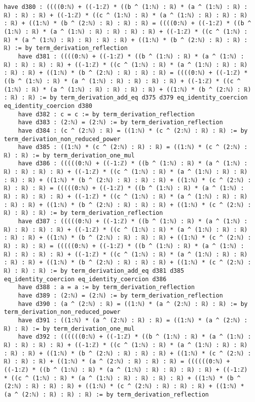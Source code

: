 \documentclass{article}
\begin{document}
\begin{tcolorbox}[colback=white!10, width=\linewidth]
\begin{lstlisting}[language=Lean4]
    have d380 : ((((0:ℕ) + ((-1:ℤ) * ((b ^ (1:ℕ) : ℝ) * (a ^ (1:ℕ) : ℝ) : ℝ) : ℝ) : ℝ) + ((-1:ℤ) * ((c ^ (1:ℕ) : ℝ) * (a ^ (1:ℕ) : ℝ) : ℝ) : ℝ) : ℝ) + ((1:ℕ) * (b ^ (2:ℕ) : ℝ) : ℝ) : ℝ) = ((((0:ℕ) + ((-1:ℤ) * ((b ^ (1:ℕ) : ℝ) * (a ^ (1:ℕ) : ℝ) : ℝ) : ℝ) : ℝ) + ((-1:ℤ) * ((c ^ (1:ℕ) : ℝ) * (a ^ (1:ℕ) : ℝ) : ℝ) : ℝ) : ℝ) + ((1:ℕ) * (b ^ (2:ℕ) : ℝ) : ℝ) : ℝ) := by term_derivation_reflection
    have d381 : ((((0:ℕ) + ((-1:ℤ) * ((b ^ (1:ℕ) : ℝ) * (a ^ (1:ℕ) : ℝ) : ℝ) : ℝ) : ℝ) + ((-1:ℤ) * ((c ^ (1:ℕ) : ℝ) * (a ^ (1:ℕ) : ℝ) : ℝ) : ℝ) : ℝ) + ((1:ℕ) * (b ^ (2:ℕ) : ℝ) : ℝ) : ℝ) = ((((0:ℕ) + ((-1:ℤ) * ((b ^ (1:ℕ) : ℝ) * (a ^ (1:ℕ) : ℝ) : ℝ) : ℝ) : ℝ) + ((-1:ℤ) * ((c ^ (1:ℕ) : ℝ) * (a ^ (1:ℕ) : ℝ) : ℝ) : ℝ) : ℝ) + ((1:ℕ) * (b ^ (2:ℕ) : ℝ) : ℝ) : ℝ) := by term_derivation_add_eq d375 d379 eq_identity_coercion eq_identity_coercion d380
    have d382 : c = c := by term_derivation_reflection
    have d383 : (2:ℕ) = (2:ℕ) := by term_derivation_reflection
    have d384 : (c ^ (2:ℕ) : ℝ) = ((1:ℕ) * (c ^ (2:ℕ) : ℝ) : ℝ) := by term_derivation_non_reduced_power
    have d385 : ((1:ℕ) * (c ^ (2:ℕ) : ℝ) : ℝ) = ((1:ℕ) * (c ^ (2:ℕ) : ℝ) : ℝ) := by term_derivation_one_mul
    have d386 : (((((0:ℕ) + ((-1:ℤ) * ((b ^ (1:ℕ) : ℝ) * (a ^ (1:ℕ) : ℝ) : ℝ) : ℝ) : ℝ) + ((-1:ℤ) * ((c ^ (1:ℕ) : ℝ) * (a ^ (1:ℕ) : ℝ) : ℝ) : ℝ) : ℝ) + ((1:ℕ) * (b ^ (2:ℕ) : ℝ) : ℝ) : ℝ) + ((1:ℕ) * (c ^ (2:ℕ) : ℝ) : ℝ) : ℝ) = (((((0:ℕ) + ((-1:ℤ) * ((b ^ (1:ℕ) : ℝ) * (a ^ (1:ℕ) : ℝ) : ℝ) : ℝ) : ℝ) + ((-1:ℤ) * ((c ^ (1:ℕ) : ℝ) * (a ^ (1:ℕ) : ℝ) : ℝ) : ℝ) : ℝ) + ((1:ℕ) * (b ^ (2:ℕ) : ℝ) : ℝ) : ℝ) + ((1:ℕ) * (c ^ (2:ℕ) : ℝ) : ℝ) : ℝ) := by term_derivation_reflection
    have d387 : (((((0:ℕ) + ((-1:ℤ) * ((b ^ (1:ℕ) : ℝ) * (a ^ (1:ℕ) : ℝ) : ℝ) : ℝ) : ℝ) + ((-1:ℤ) * ((c ^ (1:ℕ) : ℝ) * (a ^ (1:ℕ) : ℝ) : ℝ) : ℝ) : ℝ) + ((1:ℕ) * (b ^ (2:ℕ) : ℝ) : ℝ) : ℝ) + ((1:ℕ) * (c ^ (2:ℕ) : ℝ) : ℝ) : ℝ) = (((((0:ℕ) + ((-1:ℤ) * ((b ^ (1:ℕ) : ℝ) * (a ^ (1:ℕ) : ℝ) : ℝ) : ℝ) : ℝ) + ((-1:ℤ) * ((c ^ (1:ℕ) : ℝ) * (a ^ (1:ℕ) : ℝ) : ℝ) : ℝ) : ℝ) + ((1:ℕ) * (b ^ (2:ℕ) : ℝ) : ℝ) : ℝ) + ((1:ℕ) * (c ^ (2:ℕ) : ℝ) : ℝ) : ℝ) := by term_derivation_add_eq d381 d385 eq_identity_coercion eq_identity_coercion d386
    have d388 : a = a := by term_derivation_reflection
    have d389 : (2:ℕ) = (2:ℕ) := by term_derivation_reflection
    have d390 : (a ^ (2:ℕ) : ℝ) = ((1:ℕ) * (a ^ (2:ℕ) : ℝ) : ℝ) := by term_derivation_non_reduced_power
    have d391 : ((1:ℕ) * (a ^ (2:ℕ) : ℝ) : ℝ) = ((1:ℕ) * (a ^ (2:ℕ) : ℝ) : ℝ) := by term_derivation_one_mul
    have d392 : ((((((0:ℕ) + ((-1:ℤ) * ((b ^ (1:ℕ) : ℝ) * (a ^ (1:ℕ) : ℝ) : ℝ) : ℝ) : ℝ) + ((-1:ℤ) * ((c ^ (1:ℕ) : ℝ) * (a ^ (1:ℕ) : ℝ) : ℝ) : ℝ) : ℝ) + ((1:ℕ) * (b ^ (2:ℕ) : ℝ) : ℝ) : ℝ) + ((1:ℕ) * (c ^ (2:ℕ) : ℝ) : ℝ) : ℝ) + ((1:ℕ) * (a ^ (2:ℕ) : ℝ) : ℝ) : ℝ) = ((((((0:ℕ) + ((-1:ℤ) * ((b ^ (1:ℕ) : ℝ) * (a ^ (1:ℕ) : ℝ) : ℝ) : ℝ) : ℝ) + ((-1:ℤ) * ((c ^ (1:ℕ) : ℝ) * (a ^ (1:ℕ) : ℝ) : ℝ) : ℝ) : ℝ) + ((1:ℕ) * (b ^ (2:ℕ) : ℝ) : ℝ) : ℝ) + ((1:ℕ) * (c ^ (2:ℕ) : ℝ) : ℝ) : ℝ) + ((1:ℕ) * (a ^ (2:ℕ) : ℝ) : ℝ) : ℝ) := by term_derivation_reflection

\end{lstlisting}
\end{tcolorbox}
\end{document}

